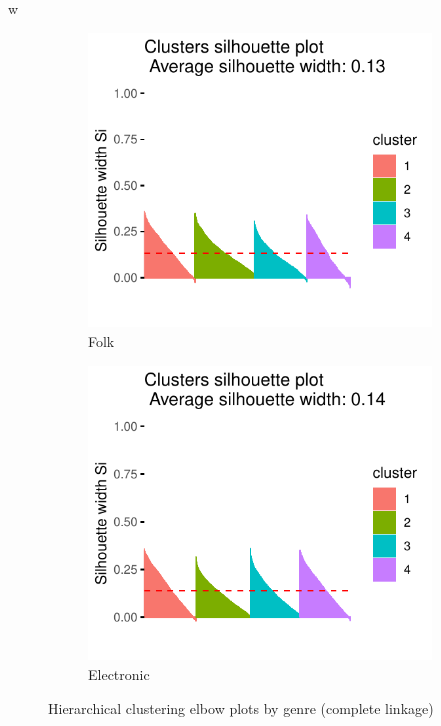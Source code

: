 w\documentclass[11pt, oneside]{article}
\begin{document}
\begin{figure}[h]
    \begin{subfigure}[b]{0.5\textwidth}
        \includegraphics[width=\textwidth]{folk_silplot.pdf} 
        \caption{Folk}
    \end{subfigure}%
    \begin{subfigure}[b]{0.5\textwidth}
        \includegraphics[width=\textwidth]{elec_silplot.pdf} 
        \caption{Electronic}
    \end{subfigure}%
\caption{Hierarchical clustering elbow plots by genre (complete linkage)}
\label{fig:silplots}
\end{figure}
\end{document}
